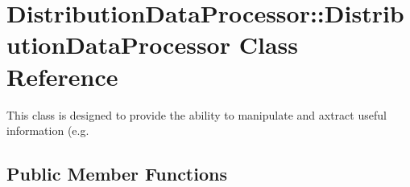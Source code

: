 \hypertarget{class_distribution_data_processor_1_1_distribution_data_processor}{
\section{DistributionDataProcessor::DistributionDataProcessor Class Reference}
\label{class_distribution_data_processor_1_1_distribution_data_processor}
}


This class is designed to provide the ability to manipulate and axtract useful information (e.g.  


\subsection*{Public Member Functions}
